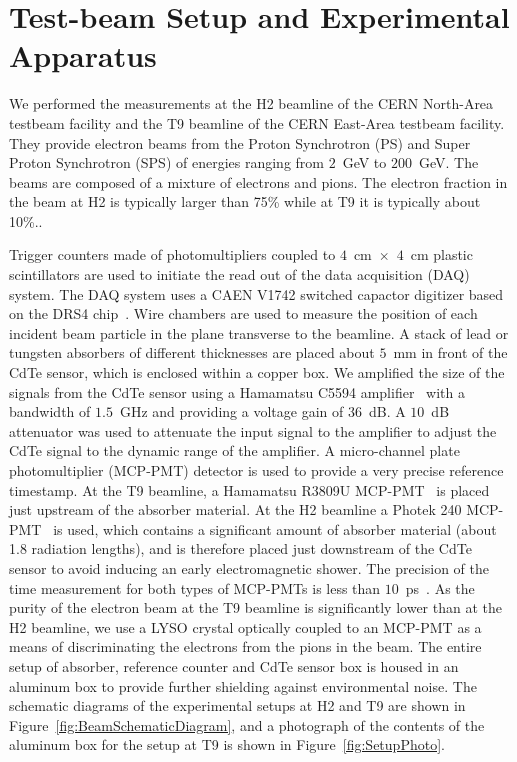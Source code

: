 \section{Test-beam Setup and Experimental Apparatus }
\label{sec:tbeam}

We performed the measurements at the H2 beamline of the CERN North-Area testbeam facility
and the T9 beamline of the CERN East-Area testbeam facility. They provide electron beams 
from the Proton Synchrotron (PS) and Super Proton Synchrotron (SPS)
of energies ranging from $2$~GeV to $200$~GeV. The beams are composed of 
a mixture of electrons and pions. The electron fraction in the beam at H2 is typically larger than 75\%
while at T9 it is typically about 10\%.. 

Trigger counters made of photomultipliers coupled to $4$~$\mathrm{cm}$~$\times$~$4$~$\mathrm{cm}$ 
plastic scintillators are used 
to initiate the read out of the data acquisition (DAQ) system. The DAQ system
uses a CAEN V1742 switched capactor digitizer based on the DRS4 chip~\cite{DRS4}. Wire chambers
are used to measure the position of each incident beam particle in the plane transverse
to the beamline. A stack of lead or tungsten absorbers of different thicknesses are 
placed about $5$~mm in front of the CdTe sensor, which is 
enclosed within a copper box. We amplified the size of the
signals from the CdTe sensor using a Hamamatsu C5594 amplifier~\cite{HamaAmpDataSheet} with a bandwidth of
$1.5$~GHz and providing a voltage gain of $36$~dB. A $10$~dB attenuator was used to attenuate the input signal 
to the amplifier to adjust the CdTe signal to the dynamic range of the amplifier. 
A micro-channel plate photomultiplier (MCP-PMT)
detector is used to provide a very precise reference timestamp. At the T9 beamline,
a Hamamatsu R3809U MCP-PMT~\cite{HamaMCPDataSheet} is placed just upstream of the absorber material. 
At the H2 beamline a Photek 240 MCP-PMT~\cite{PhotekDataSheet} is used, which contains a significant 
amount of absorber material (about 1.8 radiation lengths), and is therefore placed 
just downstream of the CdTe sensor to avoid inducing an early electromagnetic shower.
The precision of the time measurement for both types of MCP-PMTs is less than 
$10$~ps~\cite{MCPShowerMaxPaper,Anderson:2015gha}. As the purity of the electron beam at the T9 beamline is
significantly lower than at the H2 beamline, we use a LYSO crystal
optically coupled to an MCP-PMT as a means of discriminating the electrons from the pions
in the beam. The entire setup of absorber, reference counter and CdTe sensor box is housed in an aluminum
box to provide further shielding against environmental noise.
The schematic diagrams of the experimental setups at H2 and T9 
are shown in Figure~\ref{fig:BeamSchematicDiagram}, and a photograph
of the contents of the aluminum box for the setup at T9 is shown in 
Figure~\ref{fig:SetupPhoto}.


